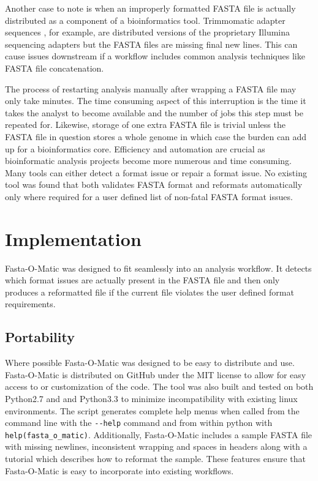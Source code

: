\documentclass{bmcart}
\begin{document}
Another case to note is when an improperly formatted FASTA file is actually distributed as a component of a bioinformatics tool. Trimmomatic adapter sequences \cite{bolger2014trimmomatic}, for example, are distributed versions of the proprietary Illumina sequencing adapters but the FASTA files are missing final new lines. This can cause issues downstream if a workflow includes common analysis techniques like FASTA file concatenation. 

The process of restarting analysis manually after wrapping a FASTA file may only take minutes. The time consuming aspect of this interruption is the time it takes the analyst to become available and the number of jobs this step must be repeated for. Likewise, storage of one extra FASTA file is trivial unless the FASTA file in question stores a whole genome in which case the burden can add up for a bioinformatics core. Efficiency and automation are crucial as bioinformatic analysis projects become more numerous and time consuming. Many tools can either detect a format issue or repair a format issue. No existing tool was found that both validates FASTA format and reformats automatically only where required for a user defined list of non-fatal FASTA format issues.
  
  

\section{Implementation}

Fasta-O-Matic was designed to fit seamlessly into an analysis workflow. It detects which format issues are actually present in the FASTA file and then only produces a reformatted file if the current file violates the user defined format requirements. 


\subsection{Portability}

Where possible Fasta-O-Matic was designed to be easy to distribute and use. Fasta-O-Matic is distributed on GitHub under the MIT license to allow for easy access to or customization of the code. The tool was also built and tested on both Python2.7 and and Python3.3 to minimize incompatibility with existing linux environments. The script generates complete help menus when called from the command line with the \verb|--help| command and from within python with \verb|help(fasta_o_matic)|. Additionally, Fasta-O-Matic includes a sample FASTA file with missing newlines, inconsistent wrapping and spaces in headers along with a tutorial which describes how to reformat the sample. These features ensure that Fasta-O-Matic is easy to incorporate into existing workflows.
\end{document}
